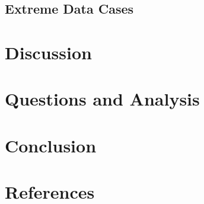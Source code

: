 \documentclass[12pt,a4paper]{report}
\begin{document}
    \section{Extreme Data Cases}

\chapter{Discussion}

\chapter{Questions and Analysis}

\chapter{Conclusion}

\chapter*{References}
\end{document}
